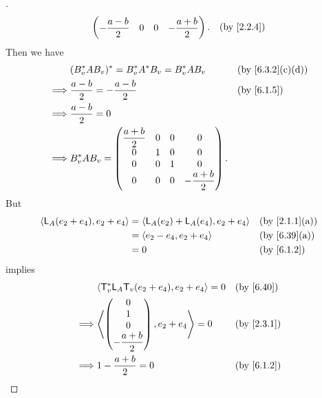 \begin{proof}[]
\begin{align*}
\begin{pmatrix}
                                     -\dfrac{a - b}{2} & 0 & 0 & -\dfrac{a + b}{2}
                                   \end{pmatrix}. &  & \by{2.2.4}
  \end{align*}
  Then we have
  \begin{align*}
             & (B_v^* A B_v)^* = B_v^* A^* B_v = B_v^* A B_v   &  & \by{6.3.2}[c,d] \\
    \implies & \dfrac{a - b}{2} = -\dfrac{a - b}{2}            &  & \by{6.1.5}      \\
    \implies & \dfrac{a - b}{2} = 0                                                 \\
    \implies & B_v^* A B_v = \begin{pmatrix}
                               \dfrac{a + b}{2} & 0 & 0 & 0                 \\
                               0                & 1 & 0 & 0                 \\
                               0                & 0 & 1 & 0                 \\
                               0                & 0 & 0 & -\dfrac{a + b}{2}
                             \end{pmatrix}.
  \end{align*}
  But
  \begin{align*}
    \inn{\L_A(e_2 + e_4), e_2 + e_4} & = \inn{\L_A(e_2) + \L_A(e_4), e_2 + e_4} &  & \by{2.1.1}[a] \\
                                     & = \inn{e_2 - e_4, e_2 + e_4}             &  & \by{6.39}[a]  \\
                                     & = 0                                      &  & \by{6.1.2}
  \end{align*}
  implies
  \begin{align*}
             & \inn{\T_v^* \L_A \T_v(e_2 + e_4), e_2 + e_4} = 0 &  & \by{6.40}       \\
    \implies & \inn{\begin{pmatrix}
                        0 \\
                        1 \\
                        0 \\
                        -\dfrac{a + b}{2}
                      \end{pmatrix}, e_2 + e_4} = 0                    &  & \by{2.3.1} \\
    \implies & 1 - \dfrac{a + b}{2} = 0                         &  & \by{6.1.2}      \\

\end{align*}
\end{proof}
